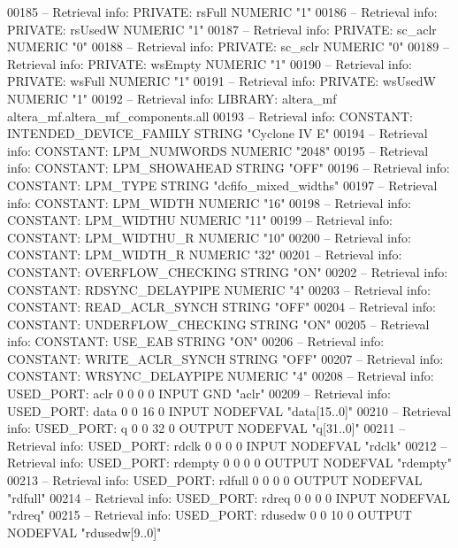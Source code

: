 \begin{DoxyCode}
{00185 \textcolor{keyword}{-- Retrieval info: PRIVATE: rsFull NUMERIC "1"}
00186 \textcolor{keyword}{-- Retrieval info: PRIVATE: rsUsedW NUMERIC "1"}
00187 \textcolor{keyword}{-- Retrieval info: PRIVATE: sc\_aclr NUMERIC "0"}
00188 \textcolor{keyword}{-- Retrieval info: PRIVATE: sc\_sclr NUMERIC "0"}
00189 \textcolor{keyword}{-- Retrieval info: PRIVATE: wsEmpty NUMERIC "1"}
00190 \textcolor{keyword}{-- Retrieval info: PRIVATE: wsFull NUMERIC "1"}
00191 \textcolor{keyword}{-- Retrieval info: PRIVATE: wsUsedW NUMERIC "1"}
00192 \textcolor{keyword}{-- Retrieval info: LIBRARY: altera\_mf altera\_mf.altera\_mf\_components.all}
00193 \textcolor{keyword}{-- Retrieval info: CONSTANT: INTENDED\_DEVICE\_FAMILY STRING "Cyclone IV E"}
00194 \textcolor{keyword}{-- Retrieval info: CONSTANT: LPM\_NUMWORDS NUMERIC "2048"}
00195 \textcolor{keyword}{-- Retrieval info: CONSTANT: LPM\_SHOWAHEAD STRING "OFF"}
00196 \textcolor{keyword}{-- Retrieval info: CONSTANT: LPM\_TYPE STRING "dcfifo\_mixed\_widths"}
00197 \textcolor{keyword}{-- Retrieval info: CONSTANT: LPM\_WIDTH NUMERIC "16"}
00198 \textcolor{keyword}{-- Retrieval info: CONSTANT: LPM\_WIDTHU NUMERIC "11"}
00199 \textcolor{keyword}{-- Retrieval info: CONSTANT: LPM\_WIDTHU\_R NUMERIC "10"}
00200 \textcolor{keyword}{-- Retrieval info: CONSTANT: LPM\_WIDTH\_R NUMERIC "32"}
00201 \textcolor{keyword}{-- Retrieval info: CONSTANT: OVERFLOW\_CHECKING STRING "ON"}
00202 \textcolor{keyword}{-- Retrieval info: CONSTANT: RDSYNC\_DELAYPIPE NUMERIC "4"}
00203 \textcolor{keyword}{-- Retrieval info: CONSTANT: READ\_ACLR\_SYNCH STRING "OFF"}
00204 \textcolor{keyword}{-- Retrieval info: CONSTANT: UNDERFLOW\_CHECKING STRING "ON"}
00205 \textcolor{keyword}{-- Retrieval info: CONSTANT: USE\_EAB STRING "ON"}
00206 \textcolor{keyword}{-- Retrieval info: CONSTANT: WRITE\_ACLR\_SYNCH STRING "OFF"}
00207 \textcolor{keyword}{-- Retrieval info: CONSTANT: WRSYNC\_DELAYPIPE NUMERIC "4"}
00208 \textcolor{keyword}{-- Retrieval info: USED\_PORT: aclr 0 0 0 0 INPUT GND "aclr"}
00209 \textcolor{keyword}{-- Retrieval info: USED\_PORT: data 0 0 16 0 INPUT NODEFVAL "data[15..0]"}
00210 \textcolor{keyword}{-- Retrieval info: USED\_PORT: q 0 0 32 0 OUTPUT NODEFVAL "q[31..0]"}
00211 \textcolor{keyword}{-- Retrieval info: USED\_PORT: rdclk 0 0 0 0 INPUT NODEFVAL "rdclk"}
00212 \textcolor{keyword}{-- Retrieval info: USED\_PORT: rdempty 0 0 0 0 OUTPUT NODEFVAL "rdempty"}
00213 \textcolor{keyword}{-- Retrieval info: USED\_PORT: rdfull 0 0 0 0 OUTPUT NODEFVAL "rdfull"}
00214 \textcolor{keyword}{-- Retrieval info: USED\_PORT: rdreq 0 0 0 0 INPUT NODEFVAL "rdreq"}
00215 \textcolor{keyword}{-- Retrieval info: USED\_PORT: rdusedw 0 0 10 0 OUTPUT NODEFVAL "rdusedw[9..0]"}
}
\end{DoxyCode}
